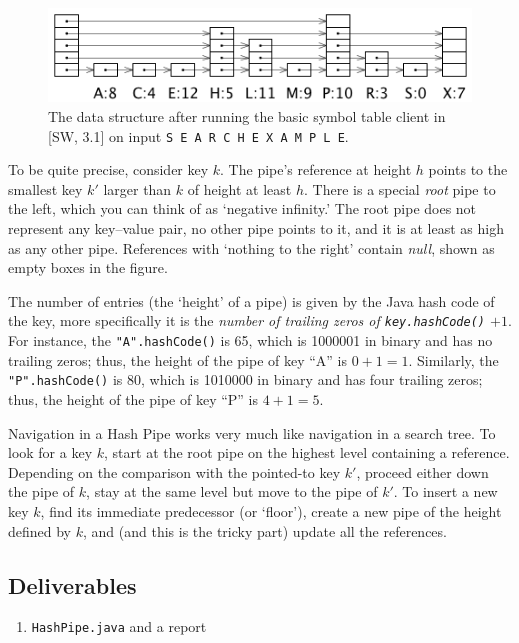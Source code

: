 \documentclass{tufte-handout}
\begin{document}
\begin{figure}
  \includegraphics[width=\textwidth]{img/full.png}
  \caption{The data structure after running the basic symbol table client in [SW, 3.1] on input {\tt S E A R C H E X A M P L E}.}
\end{figure}

To be quite precise, consider key $k$.
The pipe's reference at height $h$ points to the smallest key $k'$ larger than $k$ of height at least $h$.
There is a special \emph{root} pipe to the left, which you can think of as `negative infinity.' 
The root pipe does not represent any key--value pair, no other pipe points to it, and it is at least as high as any other pipe.
References with `nothing to the right' contain \emph{null}, shown as empty boxes in the figure.

The number of entries (the `height' of a pipe) is given by the Java hash code of the key,
more specifically it is the \emph{number of trailing zeros of {\tt key.hashCode()} $+1$}.
For instance, the {\tt "A".hashCode()} is 65, which is 1000001 in binary and has no trailing zeros; thus, the height of the pipe of key ``A'' is $0+1=1$.
Similarly, the {\tt "P".hashCode()} is 80, which is 1010000 in binary and has four trailing zeros; thus, the height of the pipe of key ``P'' is $4+1=5$.

Navigation in a Hash Pipe works very much like navigation in a search tree.
To look for a key $k$, start at the root pipe on the highest level containing a reference.
Depending on the comparison with the pointed-to key $k'$, proceed either down the pipe of $k$, stay at the same level but move to the pipe of $k'$.
To insert a new key $k$, find its immediate predecessor (or `floor'), create a new pipe of the height defined by $k$, and (and this is the tricky part) update all the references.

\subsection{Deliverables}

\begin{enumerate}
\item {\tt HashPipe.java} and a report
\end{enumerate}
\end{document}
